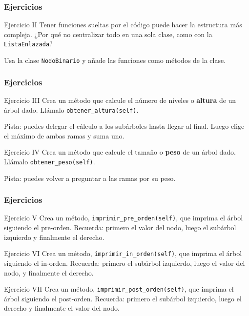 \documentclass[11pt,handout]{beamer}
\begin{document}
\begin{frame}\frametitle{Ejercicios}
\begin{block}{Ejercicio II}
Tener funciones sueltas por el código puede hacer la estructura más compleja. ¿Por qué no centralizar todo en una sola clase, como con la \lstinline|ListaEnlazada|?

Usa la clase \lstinline|NodoBinario| y añade las funciones como métodos de la clase.
\end{block}
\end{frame}

\begin{frame}\frametitle{Ejercicios}
\begin{block}{Ejercicio III}
Crea un método que calcule el número de niveles o \textbf{altura} de un árbol dado. Llámalo \lstinline|obtener_altura(self)|.

Pista: puedes delegar el cálculo a los subárboles hasta llegar al final. Luego elige el máximo de ambas ramas y suma uno.
\end{block}
\begin{block}{Ejercicio IV}
Crea un método que calcule el tamaño o \textbf{peso} de un árbol dado. Llámalo \lstinline|obtener_peso(self)|.

Pista: puedes volver a preguntar a las ramas por su peso.
\end{block}
\end{frame}

\begin{frame}\frametitle{Ejercicios}
\begin{block}{Ejercicio V}
Crea un método, \lstinline|imprimir_pre_orden(self)|, que imprima el árbol siguiendo el pre-orden. Recuerda: primero el valor del nodo, luego el subárbol izquierdo y finalmente el derecho.
\end{block}
\begin{block}{Ejercicio VI}
Crea un método, \lstinline|imprimir_in_orden(self)|, que imprima el árbol siguiendo el in-orden. Recuerda: primero el subárbol izquierdo, luego el valor del nodo, y finalmente el derecho.
\end{block}
\begin{block}{Ejercicio VII}
Crea un método, \lstinline|imprimir_post_orden(self)|, que imprima el árbol siguiendo el post-orden. Recuerda: primero el subárbol izquierdo, luego el derecho y finalmente el valor del nodo.
\end{block}
\end{frame}
\end{document}
